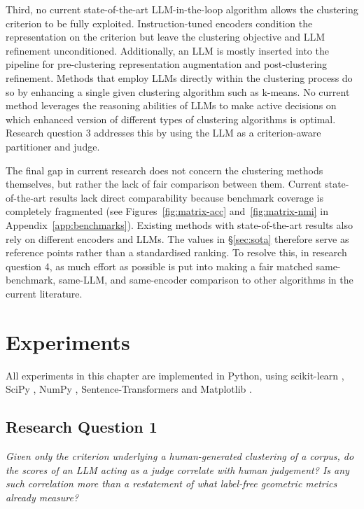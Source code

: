 \documentclass[11pt,a4paper,oneside]{report}
\begin{document}
Third, no current state-of-the-art LLM-in-the-loop algorithm allows the clustering criterion to be fully exploited. Instruction-tuned encoders \citep{su2023instructor} condition the representation on the criterion but leave the clustering objective and LLM refinement unconditioned. Additionally, an LLM is mostly inserted into the pipeline for pre-clustering representation augmentation and post-clustering refinement. Methods that employ LLMs directly within the clustering process do so by enhancing a single given clustering algorithm such as k-means. No current method leverages the reasoning abilities of LLMs to make active decisions on which enhanced version of different types of clustering algorithms is optimal. Research question 3 addresses this by using the LLM as a criterion-aware partitioner and judge.

The final gap in current research does not concern the clustering methods themselves, but rather the lack of fair comparison between them. Current state-of-the-art results lack direct comparability because benchmark coverage is completely fragmented (see Figures~\ref{fig:matrix-acc} and~\ref{fig:matrix-nmi} in Appendix~\ref{app:benchmarks}). Existing methods with state-of-the-art results also rely on different encoders and LLMs. The values in \S\ref{sec:sota} therefore serve as reference points rather than a standardised ranking. To resolve this, in research question 4, as much effort as possible is put into making a fair matched same-benchmark, same-LLM, and same-encoder comparison to other algorithms in the current literature.

\FloatBarrier
\chapter{Experiments}\label{ch:experiments}

All experiments in this chapter are implemented in Python, using scikit-learn \citep{pedregosa2011sklearn}, SciPy \citep{virtanen2020scipy}, NumPy \citep{harris2020numpy}, Sentence-Transformers \citep{reimers2019sbert} and Matplotlib \citep{hunter2007matplotlib}.

\section{Research Question 1}

\emph{Given only the criterion underlying a human-generated clustering of a corpus, do the scores of an LLM acting as a judge correlate with human judgement? Is any such correlation more than a restatement of what label-free geometric metrics already measure?}  \\
\end{document}
